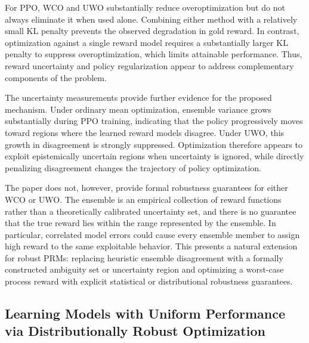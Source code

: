 \documentclass[11pt]{article}
\begin{document}
For PPO, WCO and UWO substantially reduce overoptimization but do not always eliminate it when used alone. Combining either method with a relatively small KL penalty prevents the observed degradation in gold reward. In contrast, optimization against a single reward model requires a substantially larger KL penalty to suppress overoptimization, which limits attainable performance. Thus, reward uncertainty and policy regularization appear to address complementary components of the problem.

The uncertainty measurements provide further evidence for the proposed mechanism. Under ordinary mean optimization, ensemble variance grows substantially during PPO training, indicating that the policy progressively moves toward regions where the learned reward models disagree. Under UWO, this growth in disagreement is strongly suppressed. Optimization therefore appears to exploit epistemically uncertain regions when uncertainty is ignored, while directly penalizing disagreement changes the trajectory of policy optimization.

The paper does not, however, provide formal robustness guarantees for either WCO or UWO. The ensemble is an empirical collection of reward functions rather than a theoretically calibrated uncertainty set, and there is no guarantee that the true reward lies within the range represented by the ensemble. In particular, correlated model errors could cause every ensemble member to assign high reward to the same exploitable behavior. This presents a natural extension for robust PRMs: replacing heuristic ensemble disagreement with a formally constructed ambiguity set or uncertainty region and optimizing a worst-case process reward with explicit statistical or distributional robustness guarantees.

\subsection{Learning Models with Uniform Performance via Distributionally Robust Optimization}
\end{document}
